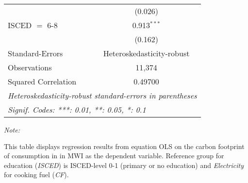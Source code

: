 \begin{table}[htbp!]
\begin{adjustbox}{width = 1\textwidth, max height = 0.95\textheight, center}
\begin{threeparttable}[b]
\begin{tabular}{lc}
                                & (0.026)\\   
            ISCED $=$ 6-8       & 0.913$^{***}$\\   
                                & (0.162)\\   
            \midrule 
            Standard-Errors     & Heteroskedasticity-robust \\   
            Observations        & 11,374\\  
            Squared Correlation & 0.49700\\  
            \midrule \midrule
            \multicolumn{2}{l}{\emph{Heteroskedasticity-robust standard-errors in parentheses}}\\
            \multicolumn{2}{l}{\emph{Signif. Codes: ***: 0.01, **: 0.05, *: 0.1}}\\
         \end{tabular}
         
         \begin{tablenotes}\item \medskip \textit{Note:}
            \item This table displays regression results from equation OLS on the carbon footprint of consumption in  in MWI as the dependent variable.  Reference group for education (\textit{ISCED}) is ISCED-level 0-1 (primary or no education) and \textit{Electricity} for cooking fuel (\textit{CF}).
         \end{tablenotes}
      \end{threeparttable}
   \end{adjustbox}
\end{table}


